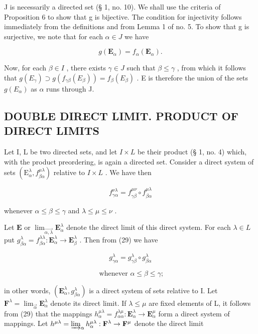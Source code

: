 J is necessarily a directed set (§ 1, no. 10). We shall use the criteria of Proposition 6 to show that g is bijective. The condition for injectivity follows immediately from the definitions and from Lemma 1 of no. 5. To show that g is surjective, we note that for each \(\alpha \in J\) we have

\[
g (\mathbf {E} _ {\alpha}) = f _ {\alpha} (\mathbf {E} _ {\alpha}).
\]

Now, for each \(\beta \in I\) , there exists \(\gamma \in J\) such that \(\beta \leqslant \gamma\) , from which it follows that \(g(E_{\gamma}) \supset g(f_{\gamma \beta}(E_{\beta})) = f_{\beta}(E_{\beta})\) . E is therefore the union of the sets \(g(E_{\alpha})\) as \(\alpha\) runs through J.

\subsection{DOUBLE DIRECT LIMIT. PRODUCT OF DIRECT LIMITS}

Let I, L be two directed sets, and let \(I \times L\) be their product (§ 1, no. 4) which, with the product preordering, is again a directed set. Consider a direct system of sets \((\mathrm{E}_{\alpha}^{\lambda}, f_{\beta\alpha}^{\mu\lambda})\) relative to \(I \times L\) . We have then

\[
f _ {\gamma \alpha} ^ {\nu \lambda} = f _ {\gamma \beta} ^ {\mu \nu} \circ f _ {\beta \alpha} ^ {\mu \lambda}\tag{29}
\]

whenever \(\alpha \leqslant \beta \leqslant \gamma\) and \(\lambda \leqslant \mu \leqslant \nu\) .

Let \(\mathbf{E}\) or \(\lim_{\overrightarrow{\alpha, \lambda}} \mathbf{E}_{\alpha}^{\lambda}\) denote the direct limit of this direct system. For each \(\lambda \in L\) put \(g_{\beta \alpha}^{\lambda} = f_{\beta \alpha}^{\lambda \lambda}: \mathbf{E}_{\alpha}^{\lambda} \to \mathbf{E}_{\beta}^{\lambda}\) . Then from (29) we have

\[
g _ {\gamma \alpha} ^ {\lambda} = g _ {\gamma \beta} ^ {\lambda} \circ g _ {\beta \alpha} ^ {\lambda}\tag{30}
\]

\[
\text { whenever } \alpha \leqslant \beta \leqslant \gamma ;
\]

in other words, \((\mathbf{E}_{\alpha}^{\lambda}, g_{\beta \alpha}^{\lambda})\) is a direct system of sets relative to I. Let \(\mathbf{F}^{\lambda} = \lim_{\overrightarrow{\alpha}} \mathbf{E}_{\alpha}^{\lambda}\) denote its direct limit. If \(\lambda \leqslant \mu\) are fixed elements of L, it follows from (29) that the mappings \(h_{\alpha}^{\mu \lambda} = f_{\alpha \alpha}^{\lambda \mu}: \mathbf{E}_{\alpha}^{\lambda} \to \mathbf{E}_{\alpha}^{\mu}\) form a direct system of mappings. Let \(h^{\mu \lambda} = \varinjlim_{\alpha} h_{\alpha}^{\mu \lambda}: \mathbf{F}^{\lambda} \to \mathbf{F}^{\mu}\) denote the direct limit

